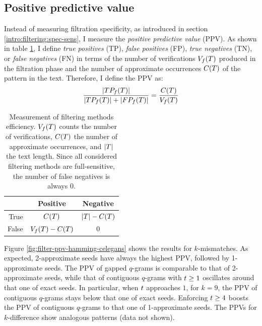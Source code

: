 
\subsection{Positive predictive value}

Instead of measuring filtration specificity, as introduced in section \ref{intro:filtering:spec-sens}, I measure the \emph{positive predictive value} (PPV).
As shown in table \ref{tab:filter:ppv}, I define \emph{true positives} (TP), \emph{false positives} (FP), \emph{true negatives} (TN), or \emph{false negatives} (FN) in terms of the number of verifications $V_f(T)$ produced in the filtration phase and the number of approximate occurrences $C(T)$ of the pattern in the text.
Therefore, I define the PPV as:
\begin{eqnarray}
\frac{|TP_f(T)|}{|TP_f(T)| + |FP_f(T)|} = \frac{C(T)}{V_f(T)}
\end{eqnarray}

\begin{table}[b]
\begin{center}
\caption[Measurement of filtering methods efficiency]{Measurement of filtering methods efficiency. $V_f(T)$ counts the number of verifications, $C(T)$ the number of approximate occurrences, and $|T|$ the text length. Since all considered filtering methods are full-sensitive, the number of false negatives is always 0.}
\begin{tabular}{rcc}
\toprule
  & Positive & Negative\\
\midrule
True & $C(T)$ & $|T| - C(T)$ \\
False & $V_f(T) - C(T)$ & 0		\\
\bottomrule
\end{tabular}
\label{tab:filter:ppv}
\end{center}
\end{table}

Figure \ref{fig:filter-ppv-hamming-celegans} shows the results for $k$-mismatches.
As expected, 2-approximate seeds have always the highest PPV, followed by 1-approximate seeds.
The PPV of gapped $q$-grams is comparable to that of 2-approximate seeds, while that of contiguous $q$-grams with $t \geq 1$ oscillates around that one of exact seeds.
In particular, when $t$ approaches $1$, \eg for $k = 9$, the PPV of contiguous $q$-grams stays below that one of exact seeds.
Enforcing $t \geq 4$ boosts the PPV of contiguous $q$-grams to that one of 1-approximate seeds.
The PPVs for $k$-difference show analogous patterns (data not shown).

